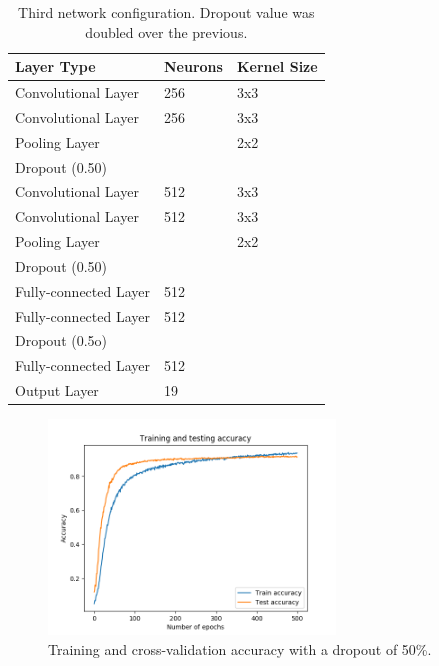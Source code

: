 \documentclass[journal]{IEEEtran}
\begin{document}
\begin{table}[]
\centering
\caption{Third network configuration. Dropout value was doubled over the previous.}
\label{table:network_configuration_best}
\begin{tabular}{|l|l|l|}
\hline
\textbf{Layer Type}   & \textbf{Neurons} & \textbf{Kernel Size} \\ \hline
Convolutional Layer   & 256              & 3x3                  \\ \hline
Convolutional Layer   & 256              & 3x3                  \\ \hline
Pooling Layer         &                  & 2x2                  \\ \hline
Dropout (0.50)        &                  &                      \\ \hline
Convolutional Layer   & 512              & 3x3                  \\ \hline
Convolutional Layer   & 512              & 3x3                  \\ \hline
Pooling Layer         &                  & 2x2                  \\ \hline
Dropout (0.50)        &                  &                      \\ \hline
Fully-connected Layer & 512              &                      \\ \hline
Fully-connected Layer & 512              &                      \\ \hline
Dropout (0.5o)        &                  &                      \\ \hline
Fully-connected Layer & 512              &                      \\ \hline
Output Layer          & 19               &                      \\ \hline
\end{tabular}
\end{table}

\begin{figure}[!t]
\centering
\includegraphics[width=3in]{images/test_4}
\caption{Training and cross-validation accuracy with a dropout of 50\%.}
\label{results_4}
\end{figure}
\end{document}
